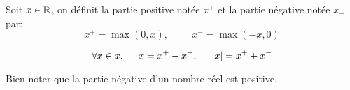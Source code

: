 \begin{defi}   
  Soit $x\in \mathbb{R}$, on définit la partie positive notée $x^+$ et la partie négative notée $x_-$ par:
\begin{displaymath}
  x^+ = \max(0,x), \hspace{1cm} x^- = \max(-x,0)
\end{displaymath}
\end{defi}
\begin{prop}
  \begin{displaymath}
    \forall x\in x, \hspace{0.5cm} x = x^+ - x^-, \hspace{0.5cm} |x| = x^+ + x^-
  \end{displaymath}
\end{prop}
Bien noter que la partie négative d'un nombre réel est positive.

